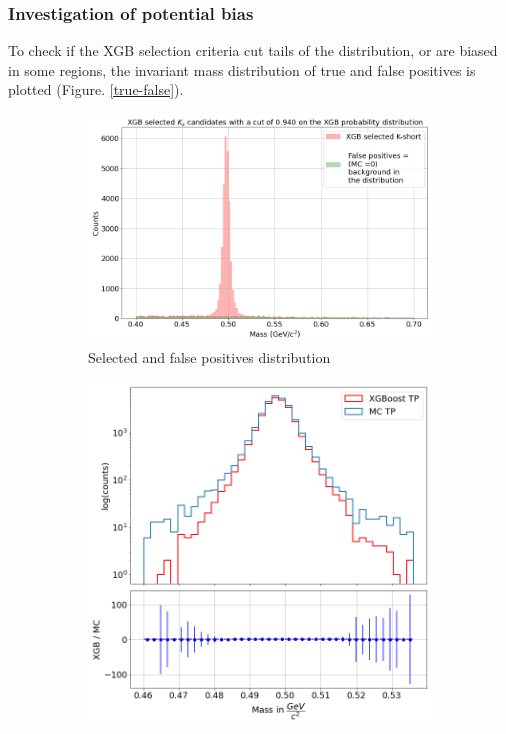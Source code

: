 \subsubsection{Investigation of potential bias}
To check if the XGB selection criteria cut tails of the distribution, or are biased in some regions, the invariant mass distribution of true and false positives is plotted (Figure. \ref{true-false}).
\begin{figure}[h!]
 \centering
    \begin{subfigure}[b]{0.79\linewidth} 
        \centering
        \includegraphics[width=\textwidth]{img/true_and_false_signal.png} 
        \caption{Selected \PKshort and false positives distribution} 
        \vspace{0.3cm}
    \end{subfigure}
     \hfill
       \begin{subfigure}[b]{0.69\linewidth}
        \centering
        \includegraphics[width=\textwidth]{img/efficiency_plot_mass.png} 

\end{subfigure}
\end{figure}
